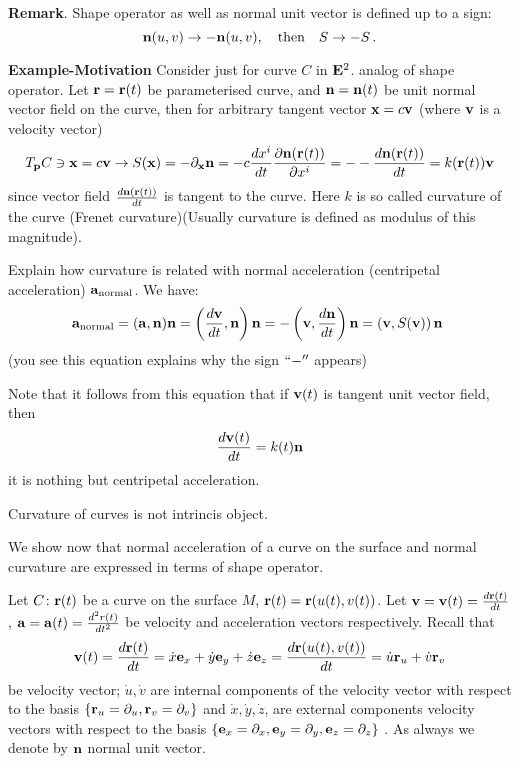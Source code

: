 \documentclass[12pt]{article}
\theoremstyle{theorem}
\numberwithin{equation}{section}
\begin{document}
{{\bf Remark}. Shape operator as well as normal unit vector is defined up to a sign:
                $$
   {\bf n}(u,v)\to -{\bf n}(u,v), \quad {\rm then}\quad  S\to -S\,.
                $$


 {\bf Example-Motivation}   Consider just for  curve $C$ in ${\bf E}^2$.
   analog of shape operator.  Let ${\bf r}={\bf r}(t)$ be parameterised curve,
and  ${\bf n}={\bf n}(t)$ be unit normal vector field
on the curve, then  for arbitrary tangent vector ${\bf x}=c{\bf v}$
(where ${\bf v}$ is a velocity vector)
            $$
  T_{\bf p} C \ni
 {\bf x}=c{\bf v}\to S({\bf x})=-\partial_{\bf x}{\bf n}=-c{d x^i\over dt}{\partial {\bf n}({\bf r}(t))\over \partial x^i}=-
          -{d{\bf n}({\bf r}(t))\over dt}=k({\bf r}(t)){\bf v}
               $$
since vector field ${d{\bf n}({\bf r}(t))\over dt}$
is tangent to the curve.  
Here $k$ is so called curvature of the curve
(Frenet curvature)(Usually curvature is defined
as modulus of this magnitude). 

Explain how curvature is related with normal acceleration
(centripetal acceleration) ${\bf a}_{\rm normal}$. We have:
               $$
{\bf a}_{\rm normal}=({\bf a},{\bf n}){\bf n}=
\left({d{\bf v}\over dt},{\bf n}\right){\bf n}=
-\left({\bf v}, {d{\bf n}\over dt}\right){\bf n}=
\left({\bf v}, S({\bf v})\right){\bf n}\
             $$ 
 (you see this equation explains why the sign $``-''$ appears)




Note that it follows from this equation that
if ${\bf v}(t)$ is tangent unit vector field, then
        $$
      {d{\bf v}(t)\over dt}=k(t){\bf n}
        $$
it is nothing but centripetal acceleration.

Curvature of curves is not intrincis object.




{\footnotesize
\bigskip We show now that normal acceleration of a curve on the surface and
normal curvature are expressed in terms
of shape operator.

Let $C\colon {\bf r}(t)$ be a curve on the surface $M$,
${\bf r}(t)={\bf r}(u(t),v(t))$. Let ${\bf v}={\bf v}(t)={d{\bf r}(t)\over dt}$, 
${\bf a}={\bf a}(t)={d^2r(t)\over dt^2}$
  be velocity and acceleration vectors respectively. Recall that
 \begin{equation}\label{internandexterncomponentsofvelocityvector2}
    {\bf v}(t)={d{\bf r}(t)\over dt}=\dot x{\bf e}_x+\dot y{\bf e}_y+\dot z{\bf e}_z=
    {d{\bf r}(u(t),v(t))\over dt}=\dot u{\bf r}_u+\dot v{\bf r}_v
 \end{equation}
  be velocity vector; $\dot u,\dot v$ are internal components of the velocity vector with respect
  to the basis $\{{\bf r}_u=\partial_u,{\bf r}_v=\partial_v\}$ and
  $\dot x, \dot y,\dot z$,
  are external components velocity  vectors with respect to 
the basis $\{{\bf e}_x=\partial_x,{\bf e}_y=\partial_y,{\bf e}_z=\partial_z\}$ .
As always we denote by ${\bf n}$ normal unit vector.

}}
\end{document}

